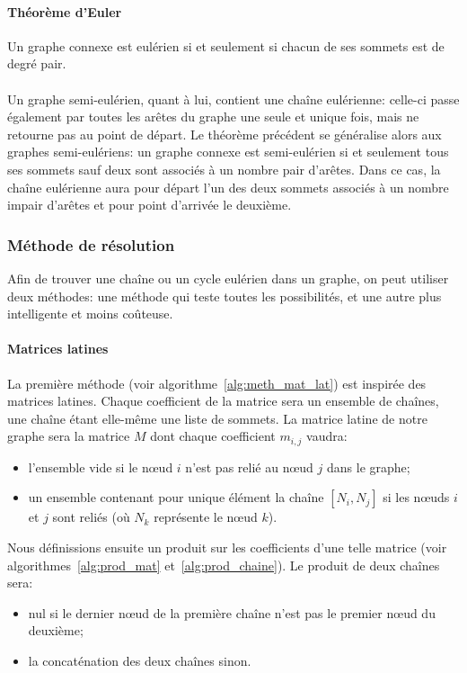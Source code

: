     \paragraph{Théorème d'Euler} Un graphe connexe est eulérien si et seulement
    si chacun de ses sommets est de degré pair.

    \paragraph{}
    Un graphe semi-eulérien, quant à lui, contient une chaîne eulérienne:
    celle-ci passe également par toutes les arêtes du graphe une seule et
    unique fois, mais ne retourne pas au point de départ. Le théorème précédent
    se généralise alors aux graphes semi-eulériens: un graphe connexe est
    semi-eulérien si et seulement tous ses sommets sauf deux sont associés à un
    nombre pair d'arêtes. Dans ce cas, la chaîne eulérienne aura pour départ
    l'un des deux sommets associés à un nombre impair d'arêtes et pour point
    d'arrivée le deuxième.

  \subsubsection{Méthode de résolution}
    Afin de trouver une chaîne ou un cycle eulérien dans un graphe, on peut
    utiliser deux méthodes: une méthode qui teste toutes les possibilités, et
    une autre plus intelligente et moins coûteuse.

    \paragraph{Matrices latines}
      La première méthode (voir algorithme~\ref{alg:meth_mat_lat}) est inspirée
      des matrices latines. Chaque coefficient de la matrice sera un ensemble
      de chaînes, une chaîne étant elle-même une liste de sommets. La matrice
      latine de notre graphe sera la matrice $M$ dont chaque coefficient
      $m_{i,j}$ vaudra:
      \begin{itemize}
        \item l'ensemble vide si le nœud $i$ n'est pas relié au nœud $j$ dans
          le graphe;
        \item un ensemble contenant pour unique élément la chaîne  $[N_i,N_j]$
          si les nœuds $i$ et $j$ sont reliés (où $N_k$ représente le nœud
          $k$).
      \end{itemize}

      Nous définissions ensuite un produit sur les coefficients d'une telle
      matrice (voir algorithmes~\ref{alg:prod_mat} et~\ref{alg:prod_chaine}). Le
      produit de deux chaînes sera:
      \begin{itemize}
        \item nul si le dernier nœud de la première chaîne n'est pas le premier
          nœud du deuxième;
        \item la concaténation des deux chaînes sinon.
      \end{itemize}


